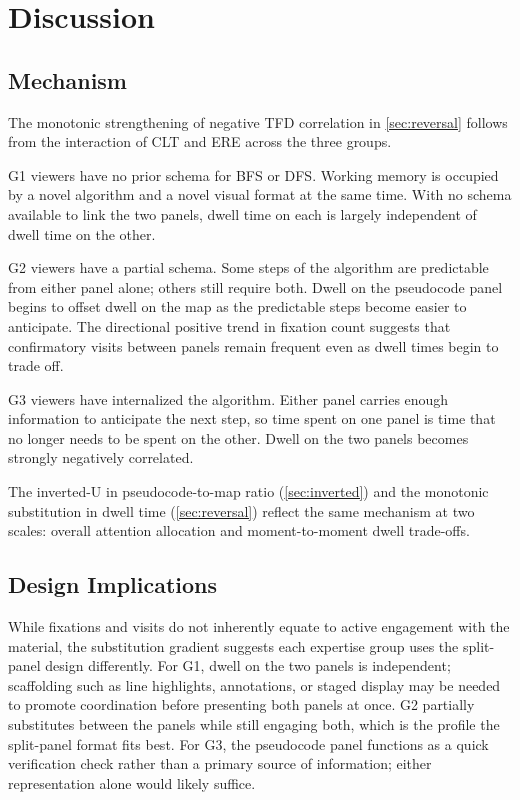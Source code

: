 \documentclass[journal]{vgtc}
\begin{document}
\section{Discussion}

\subsection{Mechanism}

The monotonic strengthening of negative TFD correlation in
\cref{sec:reversal} follows from the interaction of CLT and ERE across the
three groups.

G1 viewers have no prior schema for BFS or DFS. Working memory is occupied
by a novel algorithm and a novel visual format at the same time. With no
schema available to link the two panels, dwell time on each is largely
independent of dwell time on the other.

G2 viewers have a partial schema. Some steps of the algorithm are
predictable from either panel alone; others still require both. Dwell on
the pseudocode panel begins to offset dwell on the map as the predictable
steps become easier to anticipate. The directional positive trend in
fixation count suggests that confirmatory visits between panels remain
frequent even as dwell times begin to trade off.

G3 viewers have internalized the algorithm. Either panel carries enough
information to anticipate the next step, so time spent on one panel is
time that no longer needs to be spent on the other. Dwell on the two
panels becomes strongly negatively correlated.

The inverted-U in pseudocode-to-map ratio (\cref{sec:inverted}) and the
monotonic substitution in dwell time (\cref{sec:reversal}) reflect the
same mechanism at two scales: overall attention allocation and
moment-to-moment dwell trade-offs.

\subsection{Design Implications}

While fixations and visits do not inherently equate to active engagement
with the material, the substitution gradient suggests each expertise group
uses the split-panel design differently. For G1, dwell on the two panels
is independent; scaffolding such as line highlights, annotations, or
staged display may be needed to promote coordination before presenting
both panels at once. G2 partially substitutes between the panels while
still engaging both, which is the profile the split-panel format fits
best. For G3, the pseudocode panel functions as a quick verification
check rather than a primary source of information; either representation
alone would likely suffice.
\end{document}
